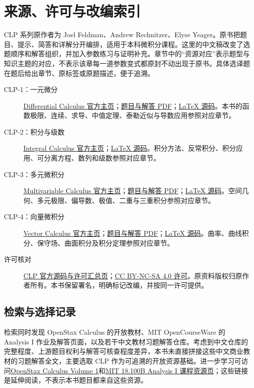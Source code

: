 \documentclass[UTF8,12pt,a4paper,fontset=fandol]{ctexart}
\begin{document}
\clearpage
\section*{来源、许可与改编索引}
\label{sec:sources}
CLP 系列原作者为 Joel Feldman、Andrew Rechnitzer、Elyse Yeager。原书把题目、提示、简答和详解分开编排，适用于本科微积分课程。这里的中文稿改变了选题顺序和解答组织，并加入参数练习与证明补充。章节中的“资源对应”表示题型与知识主题的对应，不表示该章每一道参数变式都原封不动出现于原书。具体选译题在题后给出章节、原标签或原题描述，便于追溯。
\begin{description}
\item[CLP-1：一元微分] \href{https://personal.math.ubc.ca/~CLP/CLP1/}{Differential Calculus 官方主页}；\href{https://personal.math.ubc.ca/~CLP/CLP1/clp_1_dc_problems.pdf}{题目与解答 PDF}；\href{https://github.com/arechnitzer/CLP1}{LaTeX 源码}。本书的函数极限、连续、求导、中值定理、泰勒近似与导数应用参照对应章节。
\item[CLP-2：积分与级数] \href{https://personal.math.ubc.ca/~CLP/CLP2/}{Integral Calculus 官方主页}；\href{https://github.com/arechnitzer/CLP2}{LaTeX 源码}。积分方法、反常积分、积分应用、可分离方程、数列和级数参照对应章节。
\item[CLP-3：多元微积分] \href{https://personal.math.ubc.ca/~CLP/CLP3/}{Multivariable Calculus 官方主页}；\href{https://personal.math.ubc.ca/~CLP/CLP3/clp_3_mc_problems.pdf}{题目与解答 PDF}；\href{https://github.com/arechnitzer/CLP3}{LaTeX 源码}。空间几何、多元极限、偏导数、极值、二重与三重积分参照对应章节。
\item[CLP-4：向量微积分] \href{https://personal.math.ubc.ca/~CLP/CLP4/}{Vector Calculus 官方主页}；\href{https://personal.math.ubc.ca/~CLP/CLP4/clp_4_vc_problems.pdf}{题目与解答 PDF}；\href{https://github.com/arechnitzer/CLP4}{LaTeX 源码}。曲率、曲线积分、保守场、曲面积分及积分定理参照对应章节。
\item[许可核对] \href{https://personal.math.ubc.ca/~CLP/src/}{CLP 官方源码与许可汇总页}；\href{https://creativecommons.org/licenses/by-nc-sa/4.0/}{CC BY-NC-SA 4.0 许可}。原资料版权归原作者所有。本书保留署名，明确标记改编，并按同一许可提供。
\end{description}
\subsection*{检索与选择记录}
检索同时发现 OpenStax Calculus 的开放教材、MIT OpenCourseWare 的 Analysis I 作业及解答页面，以及若干中文教材习题解答仓库。考虑到中文仓库的完整程度、上游题目权利与解答可核查程度差异，本书未直接拼接这些中文商业教材的习题解答全文，主要选取 CLP 作为可追溯的开放资源基础。进一步学习可访问\href{https://openstax.org/details/books/calculus-volume-1}{OpenStax Calculus Volume 1}和\href{https://ocw.mit.edu/courses/18-100b-analysis-i-fall-2010/download/}{MIT 18.100B Analysis I 课程资源页}；这些链接是延伸阅读，不表示本书题目都来自这些资源。
\end{document}

